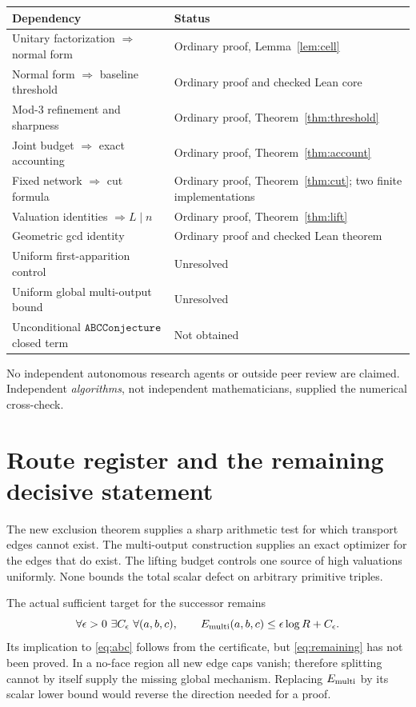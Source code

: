 \documentclass[11pt]{article}
\theoremstyle{definition}\newtheorem{definition}[theorem]{Definition}
\theoremstyle{remark}\newtheorem{remark}[theorem]{Remark}
\begin{document}
\begin{center}\small
\begin{tabular}{p{64mm}p{84mm}}\toprule
Dependency & Status\\\midrule
Unitary factorization \(\Rightarrow\) normal form & Ordinary proof, Lemma~\ref{lem:cell}\\
Normal form \(\Rightarrow\) baseline threshold & Ordinary proof and checked Lean core\\
Mod-3 refinement and sharpness & Ordinary proof, Theorem~\ref{thm:threshold}\\
Joint budget \(\Rightarrow\) exact accounting & Ordinary proof, Theorem~\ref{thm:account}\\
Fixed network \(\Rightarrow\) cut formula & Ordinary proof, Theorem~\ref{thm:cut}; two finite implementations\\
Valuation identities \(\Rightarrow L\mid n\) & Ordinary proof, Theorem~\ref{thm:lift}\\
Geometric gcd identity & Ordinary proof and checked Lean theorem\\
Uniform first-apparition control & Unresolved\\
Uniform global multi-output bound & Unresolved\\
Unconditional \(\mathtt{ABCConjecture}\) closed term & Not obtained\\\bottomrule
\end{tabular}
\end{center}
No independent autonomous research agents or outside peer review are claimed. Independent \emph{algorithms}, not independent mathematicians, supplied the numerical cross-check.

\section{Route register and the remaining decisive statement}
The new exclusion theorem supplies a sharp arithmetic test for which transport edges cannot exist. The multi-output construction supplies an exact optimizer for the edges that do exist. The lifting budget controls one source of high valuations uniformly. None bounds the total scalar defect on arbitrary primitive triples.

The actual sufficient target for the successor remains
\begin{equation}\label{eq:remaining}
 \forall\epsilon>0\ \exists C_\epsilon\ \forall(a,b,c),\qquad
 E_{\rm multi}(a,b,c)\le\epsilon\log R+C_\epsilon.
\end{equation}
Its implication to \eqref{eq:abc} follows from the certificate, but \eqref{eq:remaining} has not been proved. In a no-face region all new edge caps vanish; therefore splitting cannot by itself supply the missing global mechanism. Replacing \(E_{\rm multi}\) by its scalar lower bound would reverse the direction needed for a proof.
\end{document}
